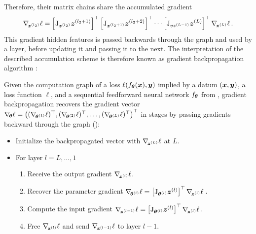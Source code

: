 Therefore, their matrix chains share the accumulated gradient
\begin{align*}
  \nabla_{\!{{\bm{z}}^{(l_2)}}}\ell
  =
  \left[
  \mathrm{J}_{{\bm{z}}^{(l_2)}}{\bm{z}}^{(l_2+1)}
  \right]^{\top}
  \left[
  \mathrm{J}_{{\bm{z}}^{(l_2+1)}}{\bm{z}}^{(l_2+2)}
  \right]^{\top}
  \cdots
  \left[
  \mathrm{J}_{vz^{(L-1)}}{\bm{z}}^{(L)}
  \right]^{\top}
  \nabla_{\!{{\bm{z}}^{(L)}}}\ell\,.
\end{align*}
This gradient \wrt hidden features is passed backwards through the graph and
used by a layer, before updating it and passing it to the next. The
interpretation of the described accumulation scheme is therefore known as
gradient backpropagation algorithm \cite{rumelhart1986learning}:%

\begin{definition}
  \label{def:background::GradientBackpropagation}
  Given the computation graph of a loss $\ell(f_{{\bm{\theta}}}({\bm{x}}), {\bm{y}})$ implied by
  a datum $({\bm{x}}, {\bm{y}})$, a loss function $\ell$, and a sequential feedforward
  neural network $f_{{\bm{\theta}}}$ from ,
  gradient backpropagation recovers the gradient vector $\nabla_{\!{{\bm{\theta}}}}\ell =
  \begin{pmatrix}
    (\nabla_{\!{{\bm{\theta}}^{(1)}}}\ell)^{\top},
    (\nabla_{\!{{\bm{\theta}}^{(2)}}}\ell)^{\top},
    \dots,
    (\nabla_{\!{{\bm{\theta}}^{(L)}}}\ell)^{\top}
  \end{pmatrix}^{\top}
  $ in stages by passing gradients backward through the graph ():
  \begin{itemize}
  \item Initialize the backpropagated vector with $\nabla_{\!{{\bm{z}}^{(L)}}}\ell$ at $L$.
  \item For layer $l = L, \dots, 1$
    \begin{enumerate}
    \item Receive the output gradient $\nabla_{\!{{\bm{z}}^{(l)}}}\ell$.
    \item Recover the parameter gradient $\nabla_{\!{{\bm{\theta}}^{(l)}}}\ell =
      \left[ \mathrm{J}_{{\bm{\theta}}^{(l)}}{\bm{z}}^{(l)}\right]^{\top}\nabla_{\!{{\bm{z}}^{(l)}}}\ell$\,.
    \item Compute the input gradient $\nabla_{\!{{\bm{z}}^{(l-1)}}}\ell = \left[
        \mathrm{J}_{{\bm{\theta}}^{(l)}}{\bm{z}}^{(l)}\right]^{\top}\nabla_{\!{{\bm{z}}^{(l)}}}\ell$\,.
    \item Free $\nabla_{\!{{\bm{z}}^{(l)}}}\ell$ and send $\nabla_{\!{{\bm{z}}^{(l-1)}}}\ell$ to layer
      $l-1$.
    \end{enumerate}
  \end{itemize}
\end{definition}
